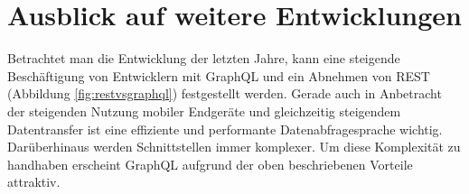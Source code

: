 \documentclass[11pt]{article}
\begin{document}
\newpage
\section{Ausblick auf weitere Entwicklungen}
Betrachtet man die Entwicklung der letzten Jahre, kann eine steigende Beschäftigung von Entwicklern mit GraphQL und ein Abnehmen von REST (Abbildung \ref{fig:restvsgraphql}) festgestellt werden. Gerade auch in Anbetracht der steigenden Nutzung mobiler Endgeräte und gleichzeitig steigendem Datentransfer ist eine effiziente und performante Datenabfragesprache wichtig. Darüberhinaus werden Schnittstellen immer komplexer. Um diese Komplexität zu handhaben erscheint GraphQL aufgrund der oben beschriebenen Vorteile attraktiv.


\end{document}
